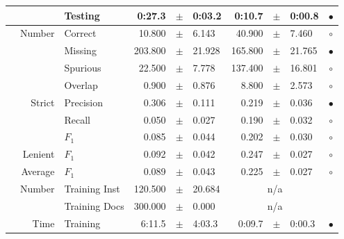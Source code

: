 \begin{longtable}{|r|r|l||rcl|rcl|c|}
\cline{3-10} &                             &         Testing &      0:27.3 &  $\pm$  &      0:03.2 &      0:10.7 &  $\pm$  &      0:00.8 & $\bullet$ \\
\hline
\pagebreak
\hline
\hline
\multirow{11}{*}{\begin{sideways}sellerabr\end{sideways} }
             & \multirow{4}{*}{    Number} &         Correct &      10.800 &  $\pm$  &       6.143 &      40.900 &  $\pm$  &       7.460 & $\circ$ \\
\cline{3-10} &                             &         Missing &     203.800 &  $\pm$  &      21.928 &     165.800 &  $\pm$  &      21.765 & $\bullet$ \\
\cline{3-10} &                             &        Spurious &      22.500 &  $\pm$  &       7.778 &     137.400 &  $\pm$  &      16.801 & $\circ$ \\
\cline{3-10} &                             &         Overlap &       0.900 &  $\pm$  &       0.876 &       8.800 &  $\pm$  &       2.573 & $\circ$ \\
\cline{2-10} & \multirow{3}{*}{    Strict} &       Precision &       0.306 &  $\pm$  &       0.111 &       0.219 &  $\pm$  &       0.036 & $\bullet$ \\
\cline{3-10} &                             &          Recall &       0.050 &  $\pm$  &       0.027 &       0.190 &  $\pm$  &       0.032 & $\circ$ \\
\cline{3-10} &                             &           $F_1$ &       0.085 &  $\pm$  &       0.044 &       0.202 &  $\pm$  &       0.030 & $\circ$ \\
\cline{2-10} &                     Lenient &           $F_1$ &       0.092 &  $\pm$  &       0.042 &       0.247 &  $\pm$  &       0.027 & $\circ$ \\
\cline{2-10} &                     Average &           $F_1$ &       0.089 &  $\pm$  &       0.043 &       0.225 &  $\pm$  &       0.027 & $\circ$ \\
\cline{2-10} & \multirow{2}{*}{    Number} &   Training Inst &     120.500 &  $\pm$  &      20.684 &    \multicolumn{3}{c|}{n/a}         &  \\
\cline{3-10} &                             &   Training Docs &     300.000 &  $\pm$  &       0.000 &    \multicolumn{3}{c|}{n/a}         &  \\
\cline{2-10} & \multirow{2}{*}{      Time} &        Training &      6:11.5 &  $\pm$  &      4:03.3 &      0:09.7 &  $\pm$  &      0:00.3 & $\bullet$ \\

\end{longtable}
